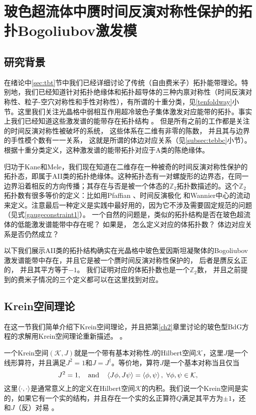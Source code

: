 
\chapter{玻色超流体中赝时间反演对称性保护的拓扑Bogoliubov激发模}

\section{研究背景}
在绪论中\ref{sec:tbt}节中我们已经详细讨论了传统（自由费米子）拓扑能带理论。特别地，我们已经知道针对拓扑绝缘体和拓扑超导体的三种内禀对称性（时间反演对称性、粒子-空穴对称性和手性对称性），有所谓的十重分类，见\ref{tenfoldway}小节。这里我们关注光晶格中弱相互作用超冷玻色子集体激发对应能带的拓扑。事实上我们已经知道这些激发谱的能带存在拓扑结构 \cite{Furukawa2015,Xu2016,Liberto2016}。
但是所有之前的工作都是关注的时间反演对称性被破坏的系统，
这些体系在二维有非零的陈数，
并且其与边界的手性模个数有一一关系，
这就是所谓的体边对应关系（见\ref{subsec:tebbc}小节）。
根据十重分类定义，这种激发谱的能带拓扑对应于A类的陈绝缘体。

归功于Kane和Mele，我们现在知道在二维存在一种被奇的时间反演对称性保护的拓扑态，即属于AII类的拓扑绝缘体。这种拓扑态有一对螺旋形的边界态，在同一边界沿着相反的方向传播；其存在与否是被一个体态的$\mathbb Z_2$拓扑数描述的。这个$\mathbb Z_2$拓扑数有很多等价的定义：比如用Pfaffian \cite{Kane2005}、时间反演极化 \cite{Fu2006} 和Wannier中心的流动 \cite{Yu2011} 来定义。注意最后一种定义是实践中最好用的，因为它不涉及需要固定规范的问题（见式\eqref{gaugeconstraint1}）。
一个自然的问题是，类似的拓扑结构是否在玻色超流体的低能激发谱能带中存在呢？
如果是，
怎么定义对应的体拓扑数？
体边对应关系是否仍然成立？

以下我们展示AII类的拓扑结构确实在光晶格中玻色爱因斯坦凝聚体的Bogoliubov激发谱能带中存在，并且它是被一个赝时间反演对称性保护的，
后者是赝反幺正的，
并且其平方等于$-1$。
我们证明对应的体拓扑数也是一个$\mathbb Z_2$数，
并且之前提到的费米子情况的三个定义都可以在这里找到对应。

\section{Krein空间理论}\label{ksf}

在这一节我们简单介绍下Krein空间理论，并且把第\ref{ch2}章里讨论的玻色型BdG方程的求解用Krein空间理论重新描述。 \cite{Peano2018,Bender2019,Lein2019}。

一个Krein空间$(\mathcal K,J)$就是一个带有基本对称性$J$的Hilbert空间$\mathcal K$，这里$J$是一个线形算符，并且满足$J^2=1$和$J=J^\dagger$。等价地，算符$J$是一个基本对称当且仅当
\begin{equation}
	J^2=1, \qand \expval{J\phi,J\psi}=\expval{\phi,\psi},\ \forall \phi,\psi\in \mathcal K,\nonumber
\end{equation}
这里$\expval{\cdot,\cdot}$是通常意义上的定义在Hilbert空间$\mathcal K$的内积。我们说一个Krein空间是实的，如果它有一个实的结构，并且存在一个实的幺正算符$Q$满足其平方为$\pm 1$，还和$J$（反）对易 \cite{SchulzBaldes2016}。

